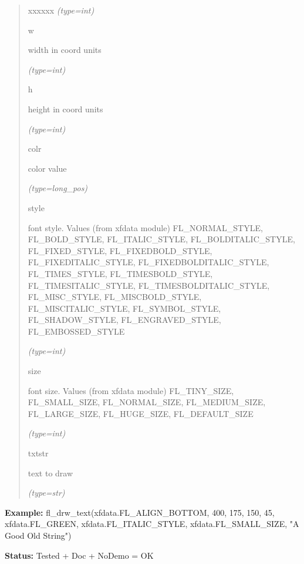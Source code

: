 \begin{boxedminipage}{\funcwidth}
\begin{quote}
\begin{Ventry}{xxxxxx}
            {\it (type=int)}

          \item[w]

          width in coord units

            {\it (type=int)}

          \item[h]

          height in coord units

            {\it (type=int)}

          \item[colr]

          color value

            {\it (type=long\_pos)}

          \item[style]

          font style. Values (from xfdata module) FL\_NORMAL\_STYLE, 
          FL\_BOLD\_STYLE, FL\_ITALIC\_STYLE, FL\_BOLDITALIC\_STYLE, 
          FL\_FIXED\_STYLE, FL\_FIXEDBOLD\_STYLE, FL\_FIXEDITALIC\_STYLE, 
          FL\_FIXEDBOLDITALIC\_STYLE, FL\_TIMES\_STYLE, 
          FL\_TIMESBOLD\_STYLE, FL\_TIMESITALIC\_STYLE, 
          FL\_TIMESBOLDITALIC\_STYLE, FL\_MISC\_STYLE, FL\_MISCBOLD\_STYLE,
          FL\_MISCITALIC\_STYLE, FL\_SYMBOL\_STYLE, FL\_SHADOW\_STYLE, 
          FL\_ENGRAVED\_STYLE, FL\_EMBOSSED\_STYLE

            {\it (type=int)}

          \item[size]

          font size. Values (from xfdata module) FL\_TINY\_SIZE, 
          FL\_SMALL\_SIZE, FL\_NORMAL\_SIZE, FL\_MEDIUM\_SIZE, 
          FL\_LARGE\_SIZE, FL\_HUGE\_SIZE, FL\_DEFAULT\_SIZE

            {\it (type=int)}

          \item[txtstr]

          text to draw

            {\it (type=str)}

        \end{Ventry}

      \end{quote}

\textbf{Example:} fl\_drw\_text(xfdata.FL\_ALIGN\_BOTTOM, 400, 175, 150, 45, 
xfdata.FL\_GREEN, xfdata.FL\_ITALIC\_STYLE, xfdata.FL\_SMALL\_SIZE, "A Good
Old String")



\textbf{Status:} Tested + Doc + NoDemo = OK



    \end{boxedminipage}


